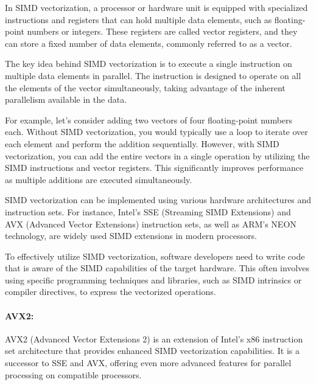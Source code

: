 In SIMD vectorization, a processor or hardware unit is equipped with
specialized instructions and registers that can hold multiple data elements,
such as floating-point numbers or integers. These registers are called vector
registers, and they can store a fixed number of data elements, commonly
referred to as a vector.

The key idea behind SIMD vectorization is to execute a single instruction on
multiple data elements in parallel. The instruction is designed to operate on
all the elements of the vector simultaneously, taking advantage of the inherent
parallelism available in the data.

For example, let's consider adding two vectors of four floating-point numbers
each. Without SIMD vectorization, you would typically use a loop to iterate
over each element and perform the addition sequentially. However, with SIMD
vectorization, you can add the entire vectors in a single operation by
utilizing the SIMD instructions and vector registers. This significantly
improves performance as multiple additions are executed simultaneously.

SIMD vectorization can be implemented using various hardware architectures and
instruction sets. For instance, Intel's SSE (Streaming SIMD Extensions) and AVX
(Advanced Vector Extensions) instruction sets, as well as ARM's NEON
technology, are widely used SIMD extensions in modern processors.

To effectively utilize SIMD vectorization, software developers need to write
code that is aware of the SIMD capabilities of the target hardware. This often
involves using specific programming techniques and libraries, such as SIMD
intrinsics or compiler directives, to express the vectorized operations.

\paragraph{AVX2:}
AVX2 (Advanced Vector Extensions 2) is an extension of Intel's x86 instruction
set architecture that provides enhanced SIMD vectorization capabilities. It is
a successor to SSE and AVX, offering even more advanced features for parallel
processing on compatible processors.

